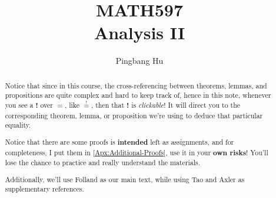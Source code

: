 \documentclass[a4paper]{report}
\author{Pingbang Hu}
\title{MATH597\\Analysis II}
\begin{document}
\maketitle

\begin{abstract}
	Notice that since in this course, the cross-referencing between theorems, lemmas, and propositions are quite complex and
	hard to keep track of, hence in this note, whenever you see a \textbf{!} over \(=\), like \(\overset{!}{=}\), then that
	\textbf{!} is \emph{clickable}! It will direct you to the corresponding theorem, lemma, or proposition we're using to deduce that particular
	equality.

	\par Notice that there are some proofs is \textbf{intended} left as assignments, and for completeness, I put them in \autoref{Apx:Additional-Proofs},
	use it in your \textbf{own risks}! You'll lose the chance to practice and really understand the materials.

	\par Additionally, we'll use Folland\cite{folland1999real} as our main text, while using Tao\cite{tao2013introduction} and Axler\cite{axler2019measure}
	as supplementary references.
\end{abstract}

\tableofcontents


\newpage
\appendix
\appendixpage



\newpage
\printbibliography
\end{document}
